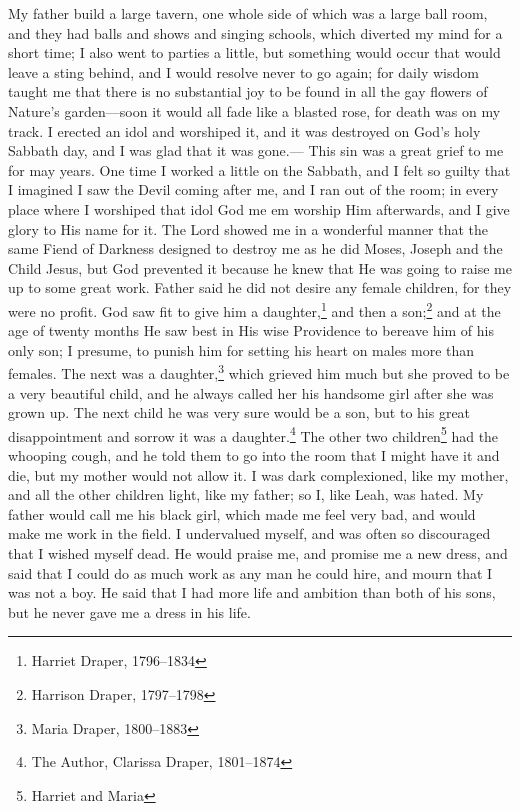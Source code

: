 My father build a large tavern, one whole side of which was a large ball room, and they had balls and shows and singing schools, which diverted my mind for a short time; I also went to parties a little, but something would occur that would leave a sting behind, and I would resolve never to go again; for daily wisdom taught me that there is no substantial joy to be found in all the gay flowers of Nature's garden---soon it would all fade like a blasted rose, for death was on my track.
I erected an idol and worshiped it, and it was destroyed on God's holy Sabbath day, and I was glad that it was gone.---%
This sin was a great grief to me for may years.
One time I worked a little on the Sabbath, and I felt so guilty that I imagined I saw the Devil coming after me, and I ran out of the room; in every place where I worshiped that idol God me em worship Him afterwards, and I give glory to His name for it.
The Lord showed me in a wonderful manner that the same Fiend of Darkness designed to destroy me as he did Moses, Joseph and the Child Jesus, but God prevented it because he knew that He was going to raise me up to some great work.
Father said he did not desire any female children, for they were no profit.
God saw fit to give him a daughter,\footnote{Harriet Draper, 1796--1834} and then a son;\footnote{Harrison Draper, 1797--1798} and at the age of twenty months He saw best in His wise Providence to bereave him of his only son; I presume, to punish him for setting his heart on males more than females.
The next was a daughter,\footnote{Maria Draper, 1800--1883} which grieved him much but she proved to be a very beautiful child, and he always called her his handsome girl after she was grown up.
The next child he was very sure would be a son, but to his great disappointment and sorrow it was a daughter.\footnote{The Author, Clarissa Draper, 1801--1874}
The other two children\footnote{Harriet and Maria} had the whooping cough, and he told them to go into the room that I might have it and die, but my mother would not allow it.
I was dark complexioned, like my mother, and all the other children light, like my father; so I, like Leah, was hated.
My father would call me his black girl, which made me feel very bad, and would make me work in the field.
I undervalued myself, and was often so discouraged that I wished myself dead.
He would praise me, and promise me a new dress, and said that I could do as much work as any man he could hire, and mourn that I was not a boy.
He said that I had more life and ambition than both of his sons, but he never gave me a dress in his life.
